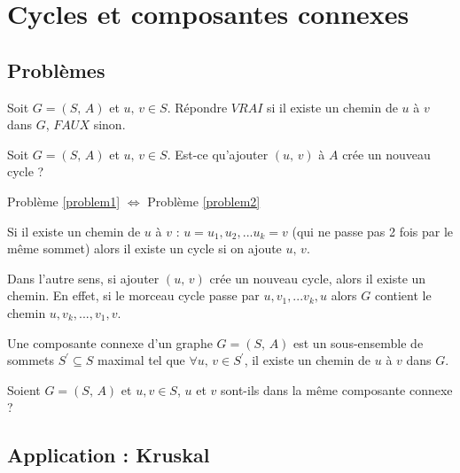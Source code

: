 \chapter{Cycles et composantes connexes}

\section{Problèmes}

\begin{problem}
Soit $G = (S,\, A)$ et $u,\, v \in S$.\newline
Répondre $VRAI$ si il existe un chemin de $u$ à $v$ dans $G$, $FAUX$ sinon.
\label{problem1}
\end{problem}

\begin{problem}
Soit $G = (S,\, A)$ et $u,\, v \in S$.\newline
Est-ce qu'ajouter $(u,\, v)$ à $A$ crée un nouveau cycle ?
\label{problem2}
\end{problem}

\begin{proposition} 
Problème \ref{problem1} $\Leftrightarrow$ Problème \ref{problem2}
\end{proposition}

Si il existe un chemin de $u$ à $v$ : $u = u_1, u_2, ... u_k = v$ (qui ne passe pas 2 fois par le même sommet) alors il existe un cycle si on ajoute $u,\, v$.

Dans l'autre sens, si ajouter $(u,\, v)$ crée un nouveau cycle, alors il existe un chemin. En effet, si le morceau cycle passe par $u, v_1, ... v_k, u$ alors $G$ contient le chemin $u, v_k, ..., v_1, v$.

\begin{definition}
Une composante connexe d'un graphe $G = (S,\, A)$ est un sous-ensemble de sommets $S^{\prime} \subseteq S$ maximal tel que $\forall u,\, v \in S^{\prime}$, il existe un chemin de $u$ à $v$ dans $G$.
\end{definition}

\begin{problem}
Soient  $G = (S,\, A)$ et $u, v \in S$, $u$ et $v$ sont-ils dans la même composante connexe ?
\label{problem3}
\end{problem}

\section{Application : Kruskal}


